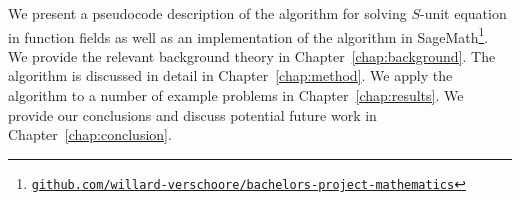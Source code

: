 We present a pseudocode description of the algorithm for solving \(S\)-unit equation in function fields as well as an implementation of the algorithm in SageMath\footnote{\href{https://github.com/willard-verschoore/bachelors-project-mathematics}{\texttt{github.com/willard-verschoore/bachelors-project-mathematics}}}. We provide the relevant background theory in Chapter~\ref{chap:background}. The algorithm is discussed in detail in Chapter~\ref{chap:method}. We apply the algorithm to a number of example problems in Chapter~\ref{chap:results}. We provide our conclusions and discuss potential future work in Chapter~\ref{chap:conclusion}.
